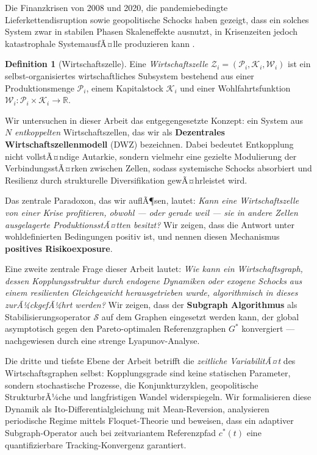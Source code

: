﻿\documentclass[a4paper,12pt]{article}
\theoremstyle{definition}
\newtheorem{definition}{Definition}
\begin{document}
Die Finanzkrisen von 2008 und 2020, die pandemiebedingte Lieferkettendisruption sowie
geopolitische Schocks haben gezeigt, dass ein solches System zwar in stabilen Phasen
Skaleneffekte ausnutzt, in Krisenzeiten jedoch katastrophale SystemausfÃ¤lle produzieren kann
\citep{acemoglu2015systemic, haldane2011systemic}.

\begin{definition}[Wirtschaftszelle]
    Eine \emph{Wirtschaftszelle} $\mathcal{Z}_i = (\mathcal{P}_i, \mathcal{K}_i, \mathcal{W}_i)$
    ist ein selbst-organisiertes wirtschaftliches Subsystem bestehend aus einer
    Produktionsmenge $\mathcal{P}_i$, einem Kapitalstock $\mathcal{K}_i$ und einer
    Wohlfahrtsfunktion $\mathcal{W}_i : \mathcal{P}_i \times \mathcal{K}_i \to \mathbb{R}$.
\end{definition}

Wir untersuchen in dieser Arbeit das entgegengesetzte Konzept: ein System aus $N$
\emph{entkoppelten} Wirtschaftszellen, das wir als \textbf{Dezentrales Wirtschaftszellenmodell}
(DWZ) bezeichnen. Dabei bedeutet Entkopplung nicht vollstÃ¤ndige Autarkie, sondern vielmehr
eine gezielte Modulierung der VerbindungsstÃ¤rken zwischen Zellen, sodass systemische Schocks
absorbiert und Resilienz durch strukturelle Diversifikation gewÃ¤hrleistet wird.

Das zentrale Paradoxon, das wir auflÃ¶sen, lautet: \emph{Kann eine Wirtschaftszelle von einer
Krise profitieren, obwohl --- oder gerade weil --- sie in andere Zellen ausgelagerte
ProduktionsstÃ¤tten besitzt?} Wir zeigen, dass die Antwort unter wohldefinierten Bedingungen
positiv ist, und nennen diesen Mechanismus \textbf{positives Risikoexposure}.

Eine zweite zentrale Frage dieser Arbeit lautet: \emph{Wie kann ein Wirtschaftsgraph, dessen
Kopplungsstruktur durch endogene Dynamiken oder exogene Schocks aus einem resilienten
Gleichgewicht herausgetrieben wurde, algorithmisch in dieses zurÃ¼ckgefÃ¼hrt werden?} Wir zeigen,
dass der \textbf{Subgraph Algorithmus} \citep{epp2026subgraph} als Stabilisierungsoperator
$\mathcal{S}$ auf dem Graphen eingesetzt werden kann, der global asymptotisch gegen den
Pareto-optimalen Referenzgraphen $G^*$ konvergiert --- nachgewiesen durch eine strenge
Lyapunov-Analyse.

Die dritte und tiefste Ebene der Arbeit betrifft die \emph{zeitliche VariabilitÃ¤t} des
Wirtschaftsgraphen selbst: Kopplungsgrade sind keine statischen Parameter, sondern
stochastische Prozesse, die Konjunkturzyklen, geopolitische StrukturbrÃ¼che und langfristigen
Wandel widerspiegeln. Wir formalisieren diese Dynamik als Ito-Differentialgleichung mit
Mean-Reversion, analysieren periodische Regime mittels Floquet-Theorie und beweisen, dass
ein adaptiver Subgraph-Operator auch bei zeitvariantem Referenzpfad $c^*(t)$ eine quantifizierbare
Tracking-Konvergenz garantiert.
\end{document}

